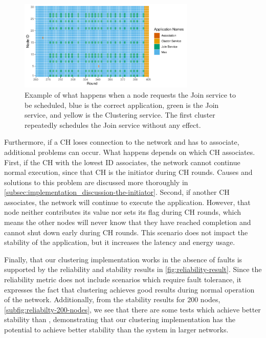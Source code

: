 \begin{figure}[bt]
    \centering
    \includegraphics[width=0.75\textwidth] {figure/Results/Discussion/50NodesRun21000x1000Scenario1Example.pdf}
    \caption{Example of what happens when a node requests the Join service to be scheduled, blue is the correct application, green is the Join service, and yellow is the Clustering service. The first cluster repeatedly schedules the Join service without any effect.}
    \label{fig:scenario-one-bug-example}
\end{figure}


\begin{newtext}
Furthermore, if a CH loses connection to the network and has to associate, additional problems can occur. What happens depends on which CH associates. First, if the CH with the lowest ID associates, the network cannot continue normal execution, since that CH is the initiator during CH rounds. Causes and solutions to this problem are discussed more thoroughly in \cref{subsec:implementation_discussion-the-initiator}. Second, if another CH associates, the network will continue to execute the application. However, that node neither contributes its value nor sets its flag during CH rounds, which means the other nodes will never know that they have reached completion and cannot shut down early during CH rounds. This scenario does not impact the stability of the application, but it increases the latency and energy usage.

Finally, that our clustering implementation works in the absence of faults is supported by the reliability and stability results in \cref{fig:reliability-result}. Since the reliability metric does not include scenarios which require fault tolerance, it expresses the fact that clustering achieves good results during normal operation of the network. Additionally, from the stability results for 200 nodes, \cref{subfig:reliabilty-200-nodes}, we see that there are some tests which achieve better stability than \atwo{}, demonstrating that our clustering implementation has the potential to achieve better stability than the \atwo{} system in larger networks.
\end{newtext}


